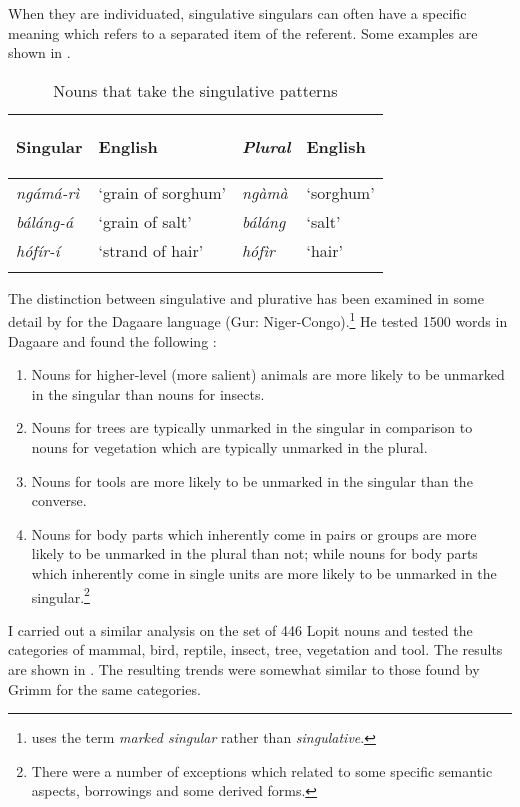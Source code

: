 \documentclass[output=paper]{langsci/langscibook}
\begin{document}
When they are individuated, singulative singulars can often have a specific meaning which refers to a separated item of the referent.  Some examples are shown in . 

\begin{table}
\begin{tabularx}{\textwidth}{>{\itshape}Xl>{\itshape}XX}
\lsptoprule

  \textup{Singular} &   {English} &   \textup{Plural} &   {English}\\ 
\midrule
 ngámá-rì &  ‘grain of sorghum’ &  ngàmà &  ‘sorghum’\\
 báláng-á &  ‘grain of salt’ &  báláng &  ‘salt’\\
 hófír-í &  ‘strand of hair’ &  hófìr &  ‘hair’\\
\lspbottomrule
\end{tabularx}
\caption{Nouns that take the singulative patterns}
\label{tab:moodie:6}
\end{table}

The distinction between singulative and plurative has been examined in some detail by \citet{Grimm2012} for the Dagaare language (Gur: Niger-Congo).\footnote{\citet{Grimm2012} uses the term \textit{marked singular} rather than \textit{singulative}.} He tested 1500 words in Dagaare and found the following \citep[50]{Grimm2012}:

\begin{enumerate}[label=\roman*.,noitemsep]
\item Nouns for higher-level (more salient) animals are more likely to be unmarked in the singular than nouns for insects. 
\item Nouns for trees are typically unmarked in the singular in comparison to nouns for vegetation which are typically unmarked in the plural. 
\item Nouns for tools are more likely to be unmarked in the singular than the converse. 
\item Nouns for body parts which inherently come in pairs or groups are more likely to be unmarked in the plural than not; while nouns for body parts which inherently come in single units are more likely to be unmarked in the singular.\footnote{There were a number of exceptions which related to some specific semantic aspects, borrowings and some derived forms.}
\end{enumerate}

I carried out a similar analysis on the set of 446 Lopit nouns and tested the categories of mammal, bird, reptile, insect, tree, vegetation and tool. The results are shown in . The resulting trends were somewhat similar to those found by Grimm for the same categories. 
\end{document}
